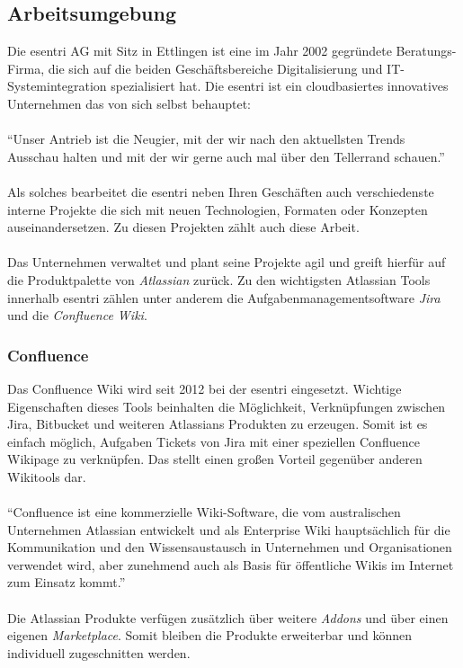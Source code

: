 \documentclass[a4paper,12pt]{scrartcl}
\begin{document}
\subsection{Arbeitsumgebung}
Die esentri AG mit Sitz in Ettlingen ist eine im Jahr 2002 gegründete Beratungs-Firma, die sich auf die beiden Geschäftsbereiche Digitalisierung und IT-Systemintegration spezialisiert hat. Die esentri ist ein cloudbasiertes innovatives Unternehmen das von sich selbst behauptet:
\\\\
“Unser Antrieb ist die Neugier, mit der wir nach den aktuellsten Trends Ausschau halten und mit der wir gerne auch mal über den Tellerrand schauen.” \footnotemark
{}
\\\\
Als solches bearbeitet die esentri neben Ihren Geschäften auch verschiedenste interne Projekte die sich mit neuen Technologien, Formaten oder Konzepten auseinandersetzen. Zu diesen Projekten zählt auch diese Arbeit. 
\\\\
Das Unternehmen verwaltet und plant seine Projekte agil und greift hierfür auf die Produktpalette von \textit{Atlassian} zurück. Zu den wichtigsten Atlassian Tools innerhalb esentri zählen unter anderem die Aufgabenmanagementsoftware \textit{Jira} und die \textit{Confluence Wiki}.

\subsubsection{Confluence}
Das Confluence Wiki wird seit 2012 bei der esentri eingesetzt. Wichtige Eigenschaften dieses Tools beinhalten die Möglichkeit, Verknüpfungen zwischen Jira, Bitbucket und weiteren Atlassians Produkten zu erzeugen. Somit ist es einfach möglich, Aufgaben Tickets von Jira mit einer speziellen Confluence Wikipage zu verknüpfen. Das stellt einen großen Vorteil gegenüber anderen Wikitools dar.
\\\\
“Confluence ist eine kommerzielle Wiki-Software, die vom australischen Unternehmen Atlassian entwickelt und als Enterprise Wiki hauptsächlich für die Kommunikation und den Wissensaustausch in Unternehmen und Organisationen verwendet wird, aber zunehmend auch als Basis für öffentliche Wikis im Internet zum Einsatz kommt.” \footnotemark
{}
\\\\
Die Atlassian Produkte verfügen zusätzlich über weitere \textit{Addons} und über einen eigenen \textit{Marketplace}. Somit bleiben die Produkte erweiterbar und können individuell zugeschnitten werden.
\end{document}
